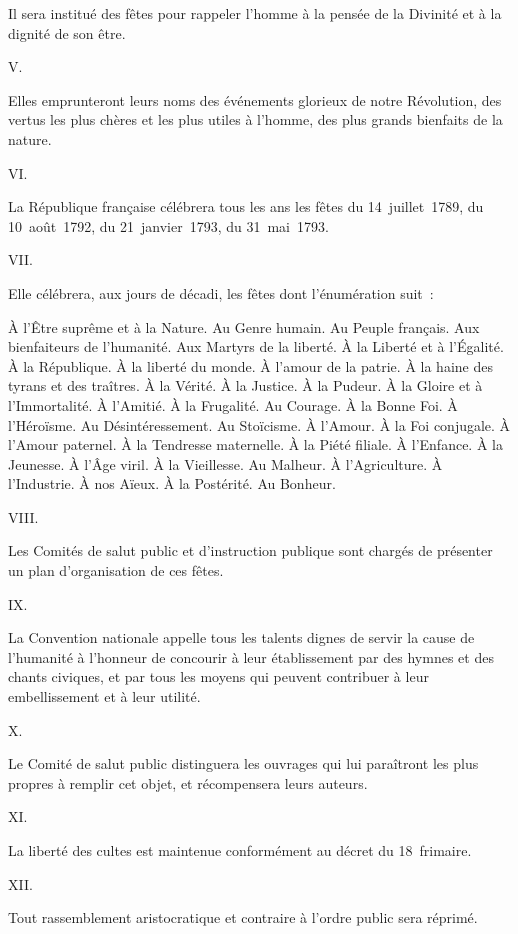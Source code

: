 \documentclass[french,twoside]{book} %
\begin{document}
Il sera institué des fêtes pour rappeler l’homme à la pensée de la Divinité et à la dignité de son être.\par
V.\par
Elles emprunteront leurs noms des événements glorieux de notre Révolution, des vertus les plus chères et les plus utiles à l’homme, des plus grands bienfaits de la nature.\par
VI.\par
La République française célébrera tous les ans les fêtes du 14 juillet 1789, du 10 août 1792, du 21 janvier 1793, du 31 mai 1793.\par
VII.\par
Elle célébrera, aux jours de décadi, les fêtes dont l’énumération suit :\par
À l’Être suprême et à la Nature. Au Genre humain. Au Peuple français. Aux bienfaiteurs de l’humanité. Aux Martyrs de la liberté. À la Liberté et à l’Égalité. À la République. À la liberté du monde. À l’amour de la patrie. À la haine des tyrans et des traîtres. À la Vérité. À la Justice. À la Pudeur. À la Gloire et à l’Immortalité. À l’Amitié. À la Frugalité. Au Courage. À la Bonne Foi. À l’Héroïsme. Au Désintéressement. Au Stoïcisme. À l’Amour. À la Foi conjugale. À l’Amour paternel. À la Tendresse maternelle. À la Piété filiale. À l’Enfance. À la Jeunesse. À l’Âge viril. À la Vieillesse. Au Malheur. À l’Agriculture. À l’Industrie. À nos Aïeux. À la Postérité. Au Bonheur.\par
VIII.\par
Les Comités de salut public et d’instruction publique sont chargés de présenter un plan d’organisation de ces fêtes.\par
IX.\par
La Convention nationale appelle tous les talents dignes de servir la cause de l’humanité à l’honneur de concourir à leur établissement par des hymnes et des chants civiques, et par tous les moyens qui peuvent contribuer à leur embellissement et à leur utilité.\par
X.\par
Le Comité de salut public distinguera les ouvrages qui lui paraîtront les plus propres à remplir cet objet, et récompensera leurs auteurs.\par
XI.\par
La liberté des cultes est maintenue conformément au décret du 18 frimaire.\par
XII.\par
Tout rassemblement aristocratique et contraire à l’ordre public sera réprimé.\par
\end{document}
